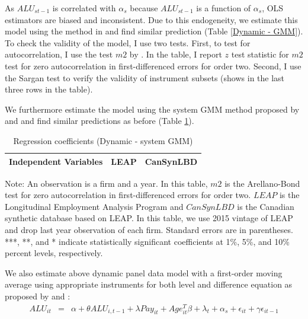\documentclass{article}
\begin{document}
As $ALU_{st-1}$ is correlated with $\alpha_{s}$ because $ALU_{st-1}$ is a function of $\alpha_{s}$, OLS estimators are biased and inconsistent. Due to this endogeneity, we estimate this model using the method in \textcite{RePEc:oup:restud:v:58:y:1991:i:2:p:277-297.} and find similar prediction (Table \ref{Dynamic - GMM}). To check the validity of the model, I use two tests. First, to test for autocorrelation, I use the test $m2$ by \textcite{RePEc:oup:restud:v:58:y:1991:i:2:p:277-297.}.  In the table, I report $z$ test statistic for $m2$ test for zero autocorrelation in first-differenced errors for order two. Second, I use the Sargan test to verify the validity of instrument subsets (shows in the last three rows in the table).

We furthermore estimate the model using the system GMM  method proposed by \textcite{RePEc:eee:econom:v:68:y:1995:i:1:p:29-51} and \textcite{RePEc:eee:econom:v:87:y:1998:i:1:p:115-143} and find similar predictions as before (Table \ref{Dynamic - system GMM}). 




\begin{table}[H]
  \centering
\begin{threeparttable}
 \caption{Regression coefficients (Dynamic - system GMM)} \label{Dynamic - system GMM} \medskip
\renewcommand{\arraystretch}{1}
\begin{tabular}{l|c c| c c}
\toprule
\textbf{Independent Variables}&\multicolumn{2}{c|}{\textbf{LEAP}} &  \multicolumn{2}{c}{\textbf{CanSynLBD}}\\
\midrule

   \bottomrule
  \end{tabular} 
\begin{tablenotes}
\small
\item Note: An observation is a firm and a year. In this table, $m2$ is the Arellano-Bond test for zero autocorrelation in first-differenced errors for order two. $LEAP$ is the Longitudinal Employment Analysis Program and $CanSynLBD$ is the Canadian synthetic database based on LEAP. In this table, we use 2015 vintage of LEAP and drop last year observation of each firm. Standard errors are in parentheses. ***, **, and * indicate statistically significant coefficients at 1\%, 5\%, and 10\% percent levels, respectively.
 \end{tablenotes}
 \end{threeparttable}
\end{table}

We also estimate above dynamic panel data model with a first-order moving average using appropriate instruments for both level and difference equation as proposed by \textcite{RePEc:eee:econom:v:68:y:1995:i:1:p:29-51} and \textcite{RePEc:eee:econom:v:87:y:1998:i:1:p:115-143}:
\begin{eqnarray}	
ALU_{it}&=&\alpha +\theta ALU_{i,t-1}+\lambda Pay_{it}+Age_{it}^{T}\beta+\lambda_t+\alpha_s+\epsilon_{it}+\gamma\epsilon_{it-1}
\end{eqnarray}
\end{document}
